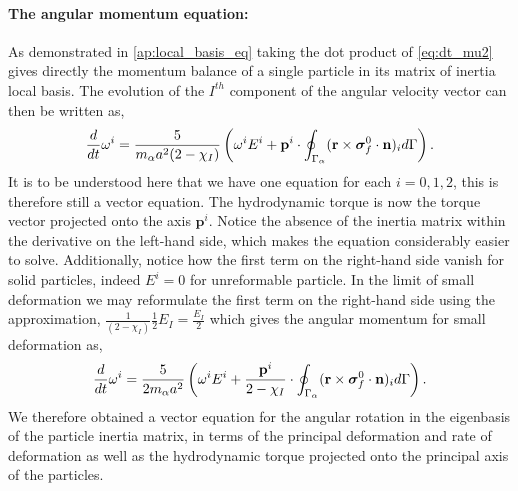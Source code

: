 \paragraph*{The angular momentum equation:}
As demonstrated in \ref{ap:local_basis_eq} taking the dot product of \ref{eq:dt_mu2} gives directly the momentum balance of a single particle in its matrix of inertia local basis. 
The evolution of the $I^{th}$ component of the angular velocity vector can then be written as, 
\begin{align*}
    \frac{d}{dt}\omega^i 
    = 
    \frac{5}{m_\alpha a^2 (2 - \chi_I)}
    \left(
    \omega^i E^i 
    +
    \textbf{p}^i\cdot \oint_{\Gamma_{\alpha}} (\textbf{r}\times\bm\sigma_f^0\cdot \textbf{n})_i d\Gamma 
    \right).    
\end{align*}
It is to be understood here that we have one equation for each $i = 0,1,2$, this is therefore still a vector equation. 
The hydrodynamic torque is now the torque vector projected onto the axis $\textbf{p}^i$. 
Notice the absence of the inertia matrix within the derivative on the left-hand side, which makes the equation considerably easier to solve.
Additionally, notice how the first term on the right-hand side vanish for solid particles, indeed $E^i = 0$ for unreformable particle. 
In the limit of small deformation we may reformulate the first term on the right-hand side using the approximation, 
$
    \frac{1}{(2-\chi_I)} \frac{1}{2} E_I 
    = \frac{E_I}{2}
$
which gives the angular momentum for small deformation as, 
\begin{align*}
    \frac{d}{dt}\omega^i 
    = 
    \frac{5}{ 2 m_\alpha a^2}
    \left(
    \omega^i E^i
    +
    \frac{\textbf{p}^i}{2 - \chi_I}\cdot \oint_{\Gamma_{\alpha}} (\textbf{r}\times\bm\sigma_f^0\cdot \textbf{n})_i d\Gamma 
    \right).    
    \label{eq:dt_omega_I}
\end{align*}
We therefore obtained a vector equation for the angular rotation in the eigenbasis of the particle inertia matrix, in terms of the principal deformation and rate of deformation as well as the hydrodynamic torque projected onto the principal axis of the particles.  



